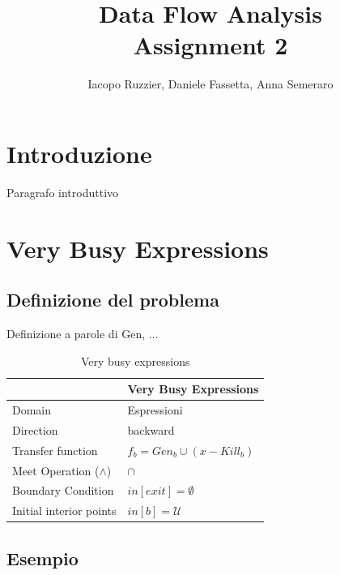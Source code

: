 \documentclass[10pt,a4paper]{article}
\begin{document}
\title{Data Flow Analysis \\
\large Assignment 2}
\author{Iacopo Ruzzier, Daniele Fassetta, Anna Semeraro}

\maketitle
\tableofcontents

\newpage

\section{Introduzione}

Paragrafo introduttivo

\section{Very Busy Expressions}
\subsection{Definizione del problema}

Definizione a parole di Gen, ...


\begin{table}[h!]
  \centering
  \begin{tabular}{|l|p{4cm}|}
    \hline
    \textbf{} & \textbf{Very Busy Expressions} \\
    \hline
    Domain & Espressioni\\
    \hline
    Direction & backward\\
    \hline
    Transfer function & $f_b = Gen_b \cup (x - Kill_b) $\\
    \hline
    Meet Operation ($\land$) & $\cap$ \\
    \hline
    Boundary Condition & $in[exit] = \emptyset$ \\
    \hline
    Initial interior points & $in[b] = \mathcal{U}$ \\
    \hline
  \end{tabular}
  \caption{Very busy expressions}
\end{table}

\subsection{Esempio}
\end{document}
